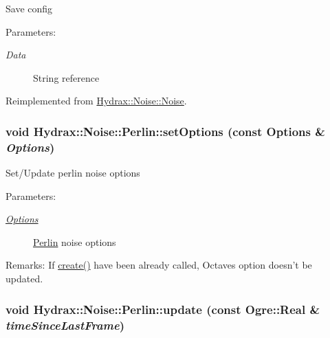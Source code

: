 Save config \begin{Desc}
\item[Parameters:]
\begin{description}
\item[{\em Data}]String reference \end{description}
\end{Desc}


Reimplemented from \hyperlink{class_hydrax_1_1_noise_1_1_noise_ac0a9fe1533ddd87467edb954f8abea8}{Hydrax::Noise::Noise}.\hypertarget{class_hydrax_1_1_noise_1_1_perlin_f32b1054557536eb5073e9ad1251a4cf}{
\subsubsection[{setOptions}]{\setlength{\rightskip}{0pt plus 5cm}void Hydrax::Noise::Perlin::setOptions (const {\bf Options} \& {\em Options})}}
\label{class_hydrax_1_1_noise_1_1_perlin_f32b1054557536eb5073e9ad1251a4cf}


Set/Update perlin noise options \begin{Desc}
\item[Parameters:]
\begin{description}
\item[{\em \hyperlink{struct_hydrax_1_1_noise_1_1_perlin_1_1_options}{Options}}]\hyperlink{class_hydrax_1_1_noise_1_1_perlin}{Perlin} noise options \end{description}
\end{Desc}
\begin{Desc}
\item[Remarks:]If \hyperlink{class_hydrax_1_1_noise_1_1_perlin_3e260e7c239d90da210aa3e27289c6f0}{create()} have been already called, Octaves option doesn't be updated. \end{Desc}
\hypertarget{class_hydrax_1_1_noise_1_1_perlin_2037c02fa7d577eb72487a1b778b62dd}{
\subsubsection[{update}]{\setlength{\rightskip}{0pt plus 5cm}void Hydrax::Noise::Perlin::update (const Ogre::Real \& {\em timeSinceLastFrame})}}
\label{class_hydrax_1_1_noise_1_1_perlin_2037c02fa7d577eb72487a1b778b62dd}


